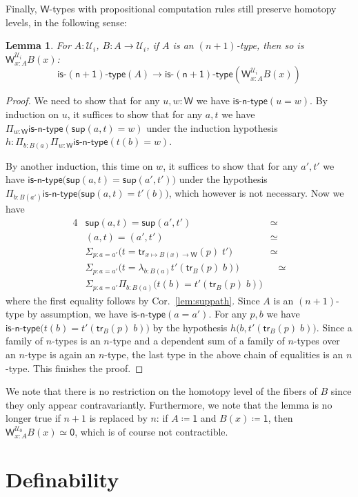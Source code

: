 \documentclass[11pt]{article}
\newcommand{\prd}[1]{\Pi_{#1}}
\newcommand{\sm}[1]{\Sigma_{#1}}
\newcommand{\lam}[1]{\lambda_{#1}}
\newcommand{\defeq}{\coloneqq}
\newcommand{\W}{\mathsf{W}}
\newcommand{\wsup}{\mathsf{sup}}
\newcommand{\one}{\mathsf{1}}
\newcommand{\zero}{\mathsf{0}}
\newcommand{\UU}{\mathcal{U}}
\newcommand{\isntype}[1]{\mathsf{is}\text{-}\mathsf{#1}\text{-}\mathsf{type}}
\newcommand{\trans}{\mathsf{tr}}
\newtheorem{lemma}[theorem]{Lemma}
\theoremstyle{definition}
\begin{document}
Finally, $\W$-types with propositional computation rules still preserve homotopy levels, in the following sense:
\begin{lemma}
For $A:\UU_i$, $B : A \to \UU_i$, if $A$ is an $(n+1)$-type, then so is $\W^{\UU_i}_{x:A} B(x)$:
\[ \isntype{(n+1)}(A) \to \isntype{(n+1)}(\W^{\UU_i}_{x:A} B(x))\]
\end{lemma}
\begin{proof}
We need to show that for any $u,w : \W$ we have $\isntype{n}(u = w)$. By induction on $u$, it suffices to show that for any $a,t$ we have $\prd{w:\W} \isntype{n}(\wsup(a,t) = w)$ under the induction hypothesis $h : \prd{b:B(a)}\prd{w:\W} \isntype{n}(t(b) = w)$. 

By another induction, this time on $w$, it suffices to show that for any $a',t'$ we have
$\isntype{n}\big(\wsup(a,t) = \wsup(a',t')\big)$ under the hypothesis $\prd{b:B(a')} \isntype{n}\big(\wsup(a,t) = t'(b)\big)$, which however is not necessary. Now we have
\begin{alignat*}{4}
& \wsup(a,t) = \wsup(a',t') & \simeq \\
& (a,t) = (a',t') & \simeq \\
& \sm{p : a = a'} \big(t = \trans_{x \mapsto B(x) \to \W}(p) \; t'\big) & \simeq \\
& \sm{p : a = a'} \big(t = \lam{b:B(a)} t'(\trans_B(p) \; b)\big) & \;\;\; \simeq \\
& \sm{p : a = a'}\prd{b:B(a)} \big(t(b) = t'(\trans_B(p) \; b)\big) & \;\;\;
\end{alignat*}
where the first equality follows by Cor.~\ref{lem:suppath}. Since $A$ is an $(n+1)$-type by assumption, we have $\isntype{n}(a=a')$. For any $p,b$ we have $\isntype{n}\big(t(b) = t'(\trans_B(p) \; b)\big)$ by the hypothesis $h\big(b,t'(\trans_B(p) \; b)\big)$. Since a family of $n$-types is an $n$-type and a dependent sum of a family of $n$-types over an $n$-type is again an $n$-type, the last type in the above chain of equalities is an $n$-type. This finishes the proof.
\end{proof}

We note that there is no restriction on the homotopy level of the fibers of $B$ since they only appear contravariantly. Furthermore, we note that the lemma is no longer true if $n+1$ is replaced by $n$: if $A \defeq \one$ and $B(x) \defeq \one$, then $\W^{\UU_0}_{x:A} B(x) \simeq \zero$, which is of course not contractible. 


\section{Definability}
\label{sec:definability}
\end{document}
